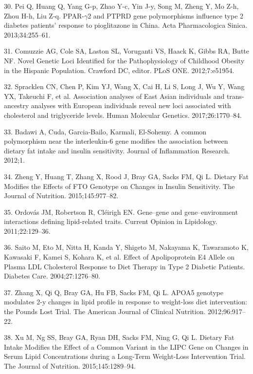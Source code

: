 \documentclass[]{article}
\begin{document}
\leavevmode\hypertarget{ref-Pei2013}{}%
30. Pei Q, Huang Q, Yang G-p, Zhao Y-c, Yin J-y, Song M, Zheng Y, Mo
Z-h, Zhou H-h, Liu Z-q. PPAR-\(\gamma\)2 and PTPRD gene polymorphisms
influence type 2 diabetes patients' response to pioglitazone in China.
Acta Pharmacologica Sinica. 2013;34:255--61.

\leavevmode\hypertarget{ref-Comuzzie2012}{}%
31. Comuzzie AG, Cole SA, Laston SL, Voruganti VS, Haack K, Gibbs RA,
Butte NF. Novel Genetic Loci Identified for the Pathophysiology of
Childhood Obesity in the Hispanic Population. Crawford DC, editor. PLoS
ONE. 2012;7:e51954.

\leavevmode\hypertarget{ref-Spracklen2017}{}%
32. Spracklen CN, Chen P, Kim YJ, Wang X, Cai H, Li S, Long J, Wu Y,
Wang YX, Takeuchi F, et al. Association analyses of East Asian
individuals and trans-ancestry analyses with European individuals reveal
new loci associated with cholesterol and triglyceride levels. Human
Molecular Genetics. 2017;26:1770--84.

\leavevmode\hypertarget{ref-Cuda2012}{}%
33. Badawi A, Cuda, Garcia-Bailo, Karmali, El-Sohemy. A common
polymorphism near the interleukin-6 gene modifies the association
between dietary fat intake and insulin sensitivity. Journal of
Inflammation Research. 2012;1.

\leavevmode\hypertarget{ref-Zheng2015}{}%
34. Zheng Y, Huang T, Zhang X, Rood J, Bray GA, Sacks FM, Qi L. Dietary
Fat Modifies the Effects of FTO Genotype on Changes in Insulin
Sensitivity. The Journal of Nutrition. 2015;145:977--82.

\leavevmode\hypertarget{ref-Ordovas2011}{}%
35. Ordovás JM, Robertson R, Cléirigh EN. Gene--gene and
gene--environment interactions defining lipid-related traits. Current
Opinion in Lipidology. 2011;22:129--36.

\leavevmode\hypertarget{ref-Saito2004}{}%
36. Saito M, Eto M, Nitta H, Kanda Y, Shigeto M, Nakayama K, Tawaramoto
K, Kawasaki F, Kamei S, Kohara K, et al. Effect of Apolipoprotein E4
Allele on Plasma LDL Cholesterol Response to Diet Therapy in Type 2
Diabetic Patients. Diabetes Care. 2004;27:1276--80.

\leavevmode\hypertarget{ref-Zhang2012}{}%
37. Zhang X, Qi Q, Bray GA, Hu FB, Sacks FM, Qi L. APOA5 genotype
modulates 2-y changes in lipid profile in response to weight-loss diet
intervention: the Pounds Lost Trial. The American Journal of Clinical
Nutrition. 2012;96:917--22.

\leavevmode\hypertarget{ref-Xu2015}{}%
38. Xu M, Ng SS, Bray GA, Ryan DH, Sacks FM, Ning G, Qi L. Dietary Fat
Intake Modifies the Effect of a Common Variant in the LIPC Gene on
Changes in Serum Lipid Concentrations during a Long-Term Weight-Loss
Intervention Trial. The Journal of Nutrition. 2015;145:1289--94.
\end{document}
